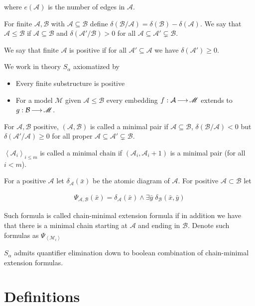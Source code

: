 \documentclass{amsart}
\newcommand{\MM}{\mathscr M}
\newcommand{\A}{\mathcal A}
\newcommand{\B}{\mathcal B}
\newcommand{\M}{\mathcal M}
\newcommand{\agl}[1]{\left\langle #1 \right\rangle}
\begin{document}
where $e(\A)$ is the number of edges in $\A$.

For finite $\A,\B$ with $\A \subseteq \B$ define $\delta(\B/\A) = \delta(\B) - \delta(\A)$.
We say that $\A \leq \B$ if $\A \subseteq \B$ and $\delta(\A'/\B) > 0$ for all $\A \subseteq \A' \subsetneq \B$.

We say that finite $\A$ is positive if for all $\A' \subseteq \A$ we have $\delta(\A') \geq 0$.

\begin{Definition}
	We work in theory $S_\alpha$ axiomatized by
	\begin{itemize}
		\item Every finite substructure is positive
		\item For a model $\MM$ given $\A \leq \B$ every embedding $f : \A \arr \MM$ extends to $g: \B \arr \MM$.
	\end{itemize}
\end{Definition}

For $\A, \B$ positive, $(\A, \B)$ is called a minimal pair if $\A \subseteq \B$, $\delta(\B/\A) < 0$ but $\delta(\A'/\A) \geq 0$ for all proper $\A \subseteq \A' \subsetneq \B$.

$\agl{\A_i}_{i \leq m}$ is called a minimal chain if $(\A_i, \A_i+1)$ is a minimal pair (for all $i < m$).

For a positive $\A$ let $\delta_\A(\bar x)$ be the atomic diagram of $\A$. For positive $\A \subset \B$ let 

\begin{align*}
	\Psi_{\A,\B}(\bar x) = \delta_\A(\bar x) \wedge \exists \bar y \; \delta_\B(\bar x, \bar y)
\end{align*}

Such formula is called chain-minimal extension formula if in addition we have that there is a minimal chain starting at $\A$ and ending in $\B$. Denote such formulas as $\Psi_{\agl{\M_i}}$

\begin{Theorem} 
	$S_\alpha$ admits quantifier elimination down to boolean combination of chain-minimal extension formulas.
\end{Theorem}


\section{Definitions}
\end{document}
